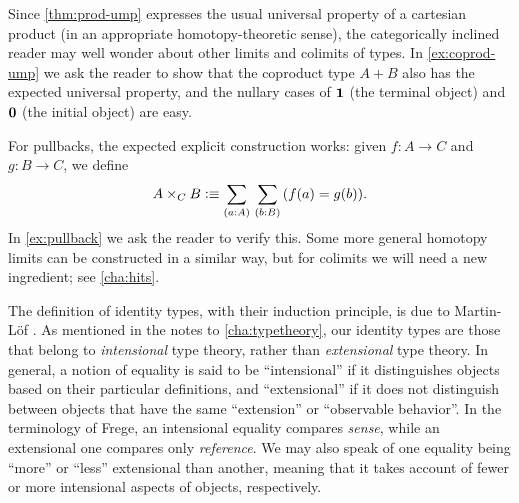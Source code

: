 %
%
%
%
Since \cref{thm:prod-ump} expresses the usual universal property of a cartesian product (in an appropriate homotopy-theoretic sense), the categorically inclined reader may well wonder about other limits and colimits of types.
In \cref{ex:coprod-ump} we ask the reader to show that the coproduct type $A+B$ also has the expected universal property, and the nullary cases of $\mathbf{1}$ (the terminal object) and $\mathbf{0}$ (the initial object) are easy.
%
%
%
%

%
For pullbacks, the expected explicit construction works: given $f:A\to C$ and $g:B\to C$, we define
\begin{equation}
  A\times_C B \defeq \sm{a:A}{b:B} (f(a)=g(b)).\label{eq:defn-pullback}
\end{equation}
In \cref{ex:pullback} we ask the reader to verify this.
Some more general homotopy limits can be constructed in a similar way, but for colimits we will need a new ingredient; see \cref{cha:hits}.

%

\sectionNotes

The definition of identity types, with their induction principle, is due to Martin-L\"of \cite{Martin-Lof-1973}.
%
%
%
%
%
As mentioned in the notes to \cref{cha:typetheory}, our identity types are those that belong to \emph{intensional} type theory, rather than \emph{extensional} type theory.
In general, a notion of equality is said to be ``intensional'' if it distinguishes objects based on their particular definitions, and ``extensional'' if it does not distinguish between objects that have the same ``extension'' or ``observable behavior''.
In the terminology of Frege, an intensional equality compares \emph{sense}, while an extensional one compares only \emph{reference}.
We may also speak of one equality being ``more'' or ``less'' extensional than another, meaning that it takes account of fewer or more intensional aspects of objects, respectively.

